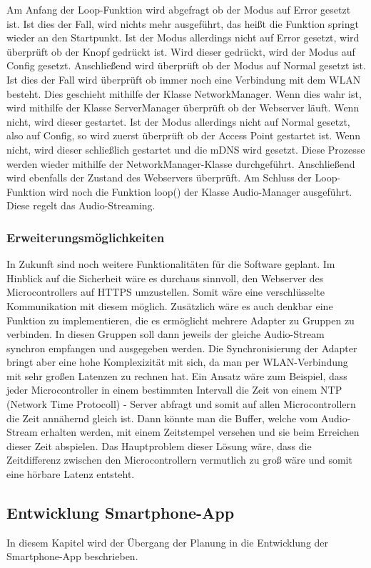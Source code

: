 \documentclass[]{article}
\begin{document}
Am Anfang der Loop-Funktion wird abgefragt ob der Modus auf Error gesetzt ist. Ist dies der Fall, wird nichts mehr ausgeführt, das heißt die Funktion springt wieder an den Startpunkt. Ist der Modus allerdings nicht auf Error gesetzt, wird überprüft ob der Knopf gedrückt ist. Wird dieser gedrückt, wird der Modus auf Config gesetzt. Anschließend wird überprüft ob der Modus auf Normal gesetzt ist. Ist dies der Fall wird überprüft ob immer noch eine Verbindung mit dem WLAN besteht. Dies geschieht mithilfe der Klasse NetworkManager. Wenn dies wahr ist, wird mithilfe der Klasse ServerManager überprüft ob der Webserver läuft. Wenn nicht, wird dieser gestartet. Ist der Modus allerdings nicht auf Normal gesetzt, also auf Config, so wird zuerst überprüft ob der Access Point gestartet ist. Wenn nicht, wird dieser schließlich gestartet und die mDNS wird gesetzt. Diese Prozesse werden wieder mithilfe der NetworkManager-Klasse durchgeführt. Anschließend wird ebenfalls der Zustand des Webservers überprüft. Am Schluss der Loop-Funktion wird noch die Funktion loop() der Klasse Audio-Manager ausgeführt. Diese regelt das Audio-Streaming.
\subsubsection{Erweiterungsmöglichkeiten}
In Zukunft sind noch weitere Funktionalitäten für die Software geplant. Im Hinblick auf die Sicherheit wäre es durchaus sinnvoll, den Webserver des Microcontrollers auf HTTPS umzustellen. Somit wäre eine verschlüsselte Kommunikation mit diesem möglich. Zusätzlich wäre es auch denkbar eine Funktion zu implementieren, die es ermöglicht mehrere Adapter zu Gruppen zu verbinden. In diesen Gruppen soll dann jeweils der gleiche Audio-Stream synchron empfangen und ausgegeben werden. Die Synchronisierung der Adapter bringt aber eine hohe Komplexizität mit sich, da man per WLAN-Verbindung mit sehr großen Latenzen zu rechnen hat. Ein Ansatz wäre zum Beispiel, dass jeder Microcontroller in einem bestimmten Intervall die Zeit von einem NTP (Network Time Protocoll) - Server abfragt und somit auf allen Microcontrollern die Zeit annähernd gleich ist. Dann könnte man die Buffer, welche vom Audio-Stream erhalten werden, mit einem Zeitstempel versehen und sie beim Erreichen dieser Zeit abspielen. Das Hauptproblem dieser Lösung wäre, dass die Zeitdifferenz zwischen den Microcontrollern vermutlich zu groß wäre und somit eine hörbare Latenz entsteht.
\subsection{Entwicklung Smartphone-App}
In diesem Kapitel wird der Übergang der Planung in die Entwicklung der Smartphone-App beschrieben.
\end{document}
